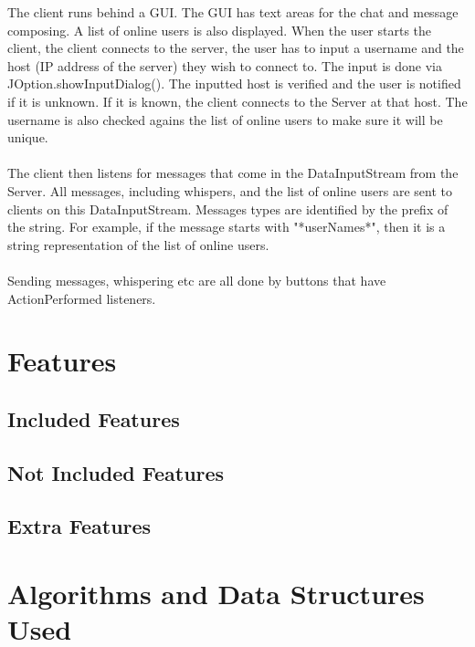 \documentclass[11pt]{article}
\begin{document}
The client runs behind a GUI. The GUI has text areas for the chat and message
composing. A list of online users is also displayed. When the user starts the
client, the client connects to the server, the user has to input a username and the host (IP
address of the server) they wish to connect to. The input is done via JOption.showInputDialog().
The inputted host is verified and the user is notified if it is unknown. If it is known, the client
connects to the Server at that host. The username is also checked agains the list of online users to
make sure it will be unique.
\\\\
The client then listens for messages that come in the DataInputStream from the Server.
All messages, including whispers, and the list of online users are sent to clients on
this DataInputStream. Messages types are identified by the prefix of the string. For
example, if the message starts with "*userNames*", then it is a string representation
of the list of online users.
\\\\
Sending messages, whispering etc are all done by buttons that have ActionPerformed
listeners. 

\section{Features}

\subsection{Included Features}

\subsection{Not Included Features}

\subsection{Extra Features}

\section{Algorithms and Data Structures Used}
\end{document}
